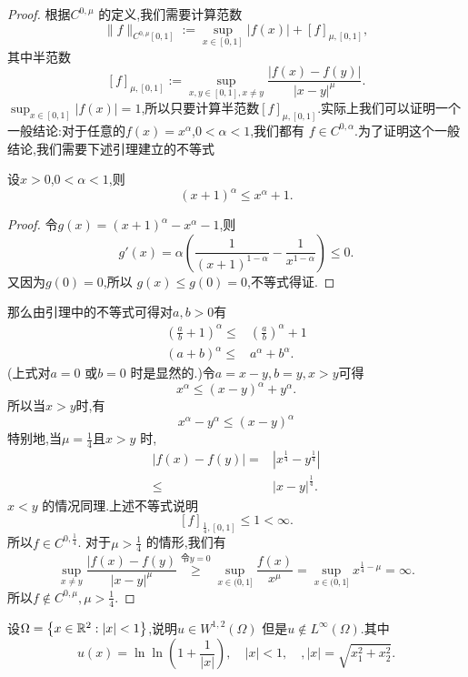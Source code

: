 \begin{proof}
  根据$C^{0,\mu}$ 的定义,我们需要计算范数
  \[
    \|f\|_{C^{0,\mu}[0,1]}:=\sup_{x\in [0,1]}|f(x)|+[f]_{\mu,[0,1]},
  \] 
  其中半范数
  \[
    [f]_{\mu,[0,1]}:=\sup_{x,y\in [0,1],x\neq y} \frac{|f(x)-f(y)|}{|x-y|^{\mu}}.
  \]
  $\sup_{x\in [0,1]}|f(x)|=1$,所以只要计算半范数$[f]_{\mu,[0,1]}$.实际上我们可以证明一个一般结论:对于任意的$f(x)=x^{\alpha}$,$0<\alpha<1$,我们都有 $f\in C^{0,\alpha}$.为了证明这个一般结论,我们需要下述引理建立的不等式
  \begin{framed}
    \begin{lemma}
      设$x>0$,$0<\alpha<1$,则
      \[
	(x+1)^{\alpha}\le x^{\alpha}+1.
      \] 
    \end{lemma}
    \begin{proof}
      令$g(x)=(x+1)^{\alpha}-x^{\alpha}-1$,则
      \[
	g'(x)=\alpha \left( \frac{1}{(x+1)^{1-\alpha}}-\frac{1}{x^{1-\alpha}} \right) \le 0.
      \] 
      又因为$g(0)=0$,所以 $g(x)\le g(0)=0$,不等式得证.
    \end{proof}
  \end{framed}
  那么由引理中的不等式可得对$a,b>0$有
  \begin{align*}
  \left (\frac{a}{b}+1\right)^{\alpha}\le&\left(\frac{a}{b}\right)^{\alpha}+1\\
  (a+b)^{\alpha}\le &a^{\alpha}+b^{\alpha}.
  \end{align*}
  (上式对$a=0$ 或$b=0$ 时是显然的.)令$a=x-y,b=y,x>y$可得
   \[
     x^{\alpha}\le (x-y)^{\alpha}+y^{\alpha}.
   \]
   所以当$x>y$时,有
    \[
      x^{\alpha}-y^{\alpha}\le (x-y)^{\alpha}
   \] 
 特别地,当$\mu=\frac{1}{4}$且$x>y$ 时,
  \begin{align*}
    |f(x)-f(y)|=&|x^{\frac{1}{4}}-y^{\frac{1}{4}}|\\
    \le  & |x-y|^{\frac{1}{4}}
  .\end{align*}
  $x<y$ 的情况同理.上述不等式说明\[
    [f]_{\frac{1}{4},[0,1]}\le 1<\infty.
  \] 
  所以$f\in C^{0,\frac{1}{4}}$.
  对于$\mu>\frac{1}{4}$ 的情形,我们有
  \[
    \sup_{x\neq y} \frac{|f(x)-f(y)}{|x-y|^{\mu}}\overset{\text{令}y=0}{\ge }\sup_{x\in (0,1]} \frac{f(x)}{x^{\mu}}=\sup_{x\in (0,1]}x^{\frac{1}{4}-\mu}=\infty.
  \]  
  所以$f\notin C^{0,\mu},\mu>\frac{1}{4}$.
\end{proof}
\begin{exercise}
  设$\Omega =\left\{ x\in \mathbb{R}^{2}:|x|<1 \right\} $,说明$u\in W^{1,2}(\Omega)$ 但是$u \notin L^{\infty}(\Omega)$.其中
  \[
    u(x)=\ln \ln (1+\frac{1}{|x|}),\quad |x|<1,\quad,|x|=\sqrt{x_1^2+x^2_2}. 
  \]
\end{exercise}
